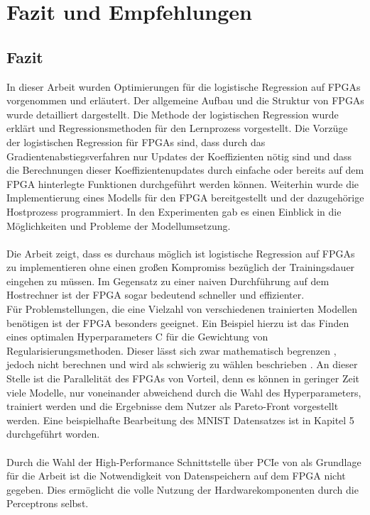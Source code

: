 \chapter{Fazit und Empfehlungen}
\section{Fazit}
In dieser Arbeit wurden Optimierungen für die logistische Regression auf FPGAs vorgenommen und erläutert. 
Der allgemeine Aufbau und die Struktur von FPGAs wurde detailliert dargestellt. Die Methode der logistischen Regression wurde erklärt und Regressionsmethoden für den Lernprozess vorgestellt. Die Vorzüge der logistischen Regression für FPGAs sind, dass durch das Gradientenabstiegsverfahren nur Updates der Koeffizienten nötig sind und dass die Berechnungen dieser Koeffizientenupdates durch einfache oder bereits auf dem FPGA hinterlegte Funktionen durchgeführt werden können. Weiterhin wurde die Implementierung eines Modells für den FPGA bereitgestellt und der dazugehörige Hostprozess programmiert. In den Experimenten gab es einen Einblick in die Möglichkeiten und Probleme der Modellumsetzung.\\\\
Die Arbeit zeigt, dass es durchaus möglich ist logistische Regression auf FPGAs zu implementieren ohne einen großen Kompromiss bezüglich der Trainingsdauer eingehen zu müssen. Im Gegensatz zu einer naiven Durchführung auf dem Hostrechner ist der FPGA sogar bedeutend schneller und effizienter.\\
Für Problemstellungen, die eine Vielzahl von verschiedenen trainierten Modellen benötigen ist der FPGA besonders geeignet. Ein Beispiel hierzu ist das Finden eines optimalen Hyperparameters C für die Gewichtung von Regularisierungsmethoden. Dieser lässt sich zwar mathematisch begrenzen \cite{NG}, jedoch nicht berechnen und wird als schwierig zu wählen beschrieben \cite{TRAN}. An dieser Stelle ist die Parallelität des FPGAs von Vorteil, denn es können in geringer Zeit viele Modelle, nur voneinander abweichend durch die Wahl des Hyperparameters, trainiert werden und die Ergebnisse dem Nutzer als Pareto-Front vorgestellt werden. Eine beispielhafte Bearbeitung des MNIST Datensatzes \cite{MNIST} ist in Kapitel 5 durchgeführt worden.\\\\
Durch die Wahl der High-Performance Schnittstelle über PCIe von \cite{DILL} als Grundlage für die Arbeit ist die Notwendigkeit von Datenspeichern auf dem FPGA nicht gegeben. Dies ermöglicht die volle Nutzung der Hardwarekomponenten durch die Perceptrons selbst.
